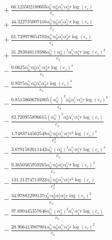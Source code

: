 \documentclass[10pt]{article}
\begin{document}
\begin{align*}
&{}  + \frac{66.123502180603 \alpha_{0}^{c_s} \alpha_{0}^s \alpha_{1}^{c_s} \alpha_{2}^s r \log{\left(c_{s} \right)}}{c_{s}} \\
&{}  + \frac{44.322735007416 \alpha_{0}^{c_s} \alpha_{0}^s \alpha_{1}^s \alpha_{2}^{c_s} r \log{\left(c_{s} \right)}}{c_{s}} \\
&{}  + \frac{61.739979054703 \alpha_{0}^{c_s} \alpha_{0}^s \alpha_{1}^s \alpha_{2}^s r \log{\left(c_{s} \right)}}{c_{s}} \\
&{}  + \frac{31.293046119386 \alpha_{0}^{c_s} \left(\alpha_{0}^s\right)^{2} \alpha_{1}^{c_s} \alpha_{1}^s r \log{\left(c_{s} \right)}^{2}}{c_{s}} \\
&{}  - \frac{0.0625 \alpha_{0}^{c_s} \alpha_{0}^s \alpha_{1}^{c_s} \alpha_{2}^s r \log{\left(c_{s} \right)}^{4}}{c_{s}} \\
&{}  - \frac{0.9375 \alpha_{0}^{c_s} \alpha_{0}^s \alpha_{1}^s \alpha_{2}^s r \log{\left(c_{s} \right)}^{4}}{c_{s}} \\
&{}  - \frac{0.85138606704805 \left(\alpha_{0}^{c_s}\right)^{2} \alpha_{0}^s \alpha_{1}^{c_s} \alpha_{1}^s r \log{\left(c_{s} \right)}^{3}}{c_{s}} \\
&{}  - \frac{82.720955896615 \left(\alpha_{0}^{c_s}\right)^{2} \alpha_{0}^s \alpha_{1}^{c_s} \alpha_{1}^s r \log{\left(c_{s} \right)}}{c_{s}} \\
&{}  - \frac{1.7483744562548 \alpha_{0}^{c_s} \alpha_{0}^s \alpha_{1}^{c_s} \alpha_{1}^s r^{2} \log{\left(c_{s} \right)}^{3}}{c_{s}^{2}} \\
&{}  - \frac{3.6791582011442 \alpha_{0}^{c_s} \left(\alpha_{0}^s\right)^{2} \alpha_{1}^{c_s} \alpha_{1}^s r \log{\left(c_{s} \right)}^{3}}{c_{s}} \\
&{}  - \frac{9.3650565959265 \alpha_{0}^{c_s} \alpha_{0}^s \alpha_{1}^s \alpha_{2}^{c_s} r \log{\left(c_{s} \right)}^{2}}{c_{s}} \\
&{}  - \frac{131.21274714922 \alpha_{0}^{c_s} \alpha_{0}^s \alpha_{1}^{c_s} \alpha_{1}^s r^{2} \log{\left(c_{s} \right)}}{c_{s}^{2}} \\
&{}  - \frac{34.97882299137 \alpha_{0}^{c_s} \alpha_{0}^s \alpha_{1}^s \alpha_{2}^s r \log{\left(c_{s} \right)}^{2}}{c_{s}} \\
&{}  - \frac{97.690445357646 \alpha_{0}^{c_s} \left(\alpha_{0}^s\right)^{2} \alpha_{1}^{c_s} \alpha_{1}^s r \log{\left(c_{s} \right)}}{c_{s}} \\
&{}  - \frac{20.906413987901 \alpha_{0}^{c_s} \alpha_{0}^s \alpha_{1}^{c_s} \alpha_{2}^s r \log{\left(c_{s} \right)}^{2}}{c_{s}}
\end{align*}
\end{document}
